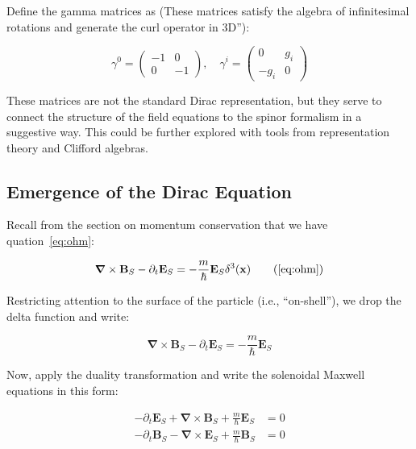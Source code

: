 \documentclass {article}
\renewcommand\vec{\mathbf}
\let\OldS\nabla
\renewcommand{\nabla}{\boldsymbol{\OldS}}
\begin{document}
Define the gamma matrices as (These matrices satisfy the algebra of infinitesimal rotations and generate the curl operator in 3D”):

\begin{equation}
\gamma^0 = \begin{pmatrix}
-1 & 0 \\
0 & -1
\end{pmatrix}, \quad
\gamma^i = \begin{pmatrix}
0 & g_i \\
-g_i & 0
\end{pmatrix}
\end{equation}

These matrices are not the standard Dirac representation, but they serve to connect the structure of the field equations to the spinor formalism in a suggestive way. This could be further explored with tools from representation theory and Clifford algebras.

\subsection{Emergence of the Dirac Equation}

Recall from the section on momentum conservation that we have quation~\eqref{eq:ohm}:

\begin{equation}
\nabla \times \vec{B}_S - \partial_t \vec{E}_S = -\frac{m}{\hbar} \vec{E}_S \delta^3(\vec{x})
\tag{\ref{eq:ohm}}
\end{equation}

Restricting attention to the surface of the particle (i.e., “on-shell”), we drop the delta function and write:

\begin{equation}
\nabla \times \vec{B}_S - \partial_t \vec{E}_S = -\frac{m}{\hbar} \vec{E}_S
\end{equation}

Now, apply the duality transformation and write the solenoidal Maxwell equations in this form:

\begin{equation}
\begin{aligned}
-\partial_t \vec{E}_S + \nabla \times \vec{B}_S + \frac{m}{\hbar} \vec{E}_S &= 0 \\
-\partial_t \vec{B}_S - \nabla \times \vec{E}_S + \frac{m}{\hbar} \vec{B}_S &= 0
\end{aligned}
\end{equation}
\end{document}
